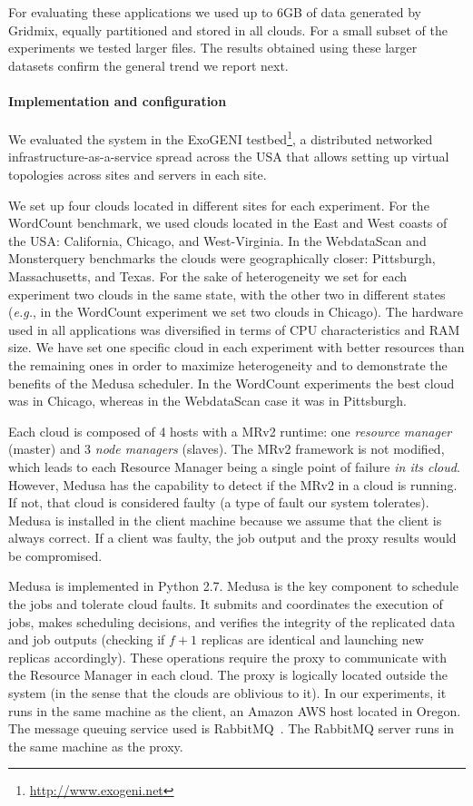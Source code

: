 \documentclass[10pt, conference, compsocconf]{IEEEtran}
\begin{document}
For evaluating these applications we used up to 6GB of data generated by Gridmix, equally partitioned and stored in all clouds.
For a small subset of the experiments we tested larger files.
The results obtained using these larger datasets confirm the general trend we report next.

\paragraph{Implementation and configuration}
We evaluated the system in the ExoGENI testbed\footnote{\url{http://www.exogeni.net}}, a distributed networked infrastructure-as-a-service spread across the USA that allows setting up virtual topologies across sites and servers in each site.

We set up four clouds located in different sites for each experiment.
For the WordCount benchmark, we used clouds  located in the East and West coasts of the USA: California, Chicago, and West-Virginia.
In the WebdataScan and Monsterquery benchmarks the clouds were geographically closer: Pittsburgh, Massachusetts, and Texas.
For the sake of heterogeneity we set for each experiment two clouds in the same state, with the other two in different states (\textit{e.g.}, in the WordCount experiment we set two clouds in Chicago).
The hardware used in all applications was diversified in terms of CPU characteristics and RAM size.
We have set one specific cloud in each experiment with better resources than the remaining ones in order to maximize heterogeneity and to demonstrate the benefits of the Medusa scheduler.
In the WordCount experiments the best cloud was in Chicago, whereas in the WebdataScan case it was in Pittsburgh.

Each cloud is composed of 4 hosts with a MRv2 runtime: one \emph{resource manager} (master) and 3 \emph{node managers}  (slaves).
The MRv2 framework is not modified, which leads to each Resource Manager being a single point of failure \emph{in its cloud}.
However, Medusa has the capability to detect if the MRv2 in a cloud is running.
If not, that cloud is considered faulty (a type of fault our system tolerates).
Medusa is installed in the client machine because we assume that the client is always correct. If a client was faulty, the job output and the proxy results would be compromised.



Medusa is implemented in Python 2.7. Medusa is the key component to schedule the jobs and tolerate cloud faults. It submits and coordinates the execution of jobs, makes scheduling decisions, and verifies the integrity of the replicated data and job outputs (checking if $f+1$ replicas are identical and launching new replicas accordingly).
These operations require the proxy to communicate with the Resource Manager in each cloud. The proxy is logically located outside the system (in the sense that the clouds are oblivious to it). In our experiments, it  runs in the same machine as the client, an Amazon AWS host located in Oregon.
The message queuing service used is RabbitMQ~\cite{videla2012rabbitmq}. The RabbitMQ server runs in the same machine as the proxy.
\end{document}
